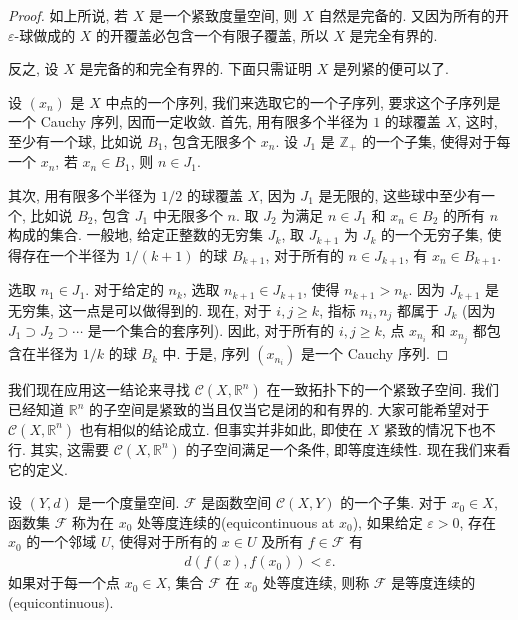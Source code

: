 \documentclass[../../main.tex]{subfiles}
\begin{document}
\begin{proof}
如上所说, 若 $X$ 是一个紧致度量空间, 则 $X$ 自然是完备的. 又因为所有的开 $\varepsilon$-球做成的 $X$ 的开覆盖必包含一个有限子覆盖, 所以 $X$ 是完全有界的.

反之, 设 $X$ 是完备的和完全有界的. 下面只需证明 $X$ 是列紧的便可以了.

设 $(x_n)$ 是 $X$ 中点的一个序列, 我们来选取它的一个子序列, 要求这个子序列是一个 Cauchy 序列, 因而一定收敛. 首先, 用有限多个半径为 $1$ 的球覆盖 $X$, 这时, 至少有一个球, 比如说 $B_1$, 包含无限多个 $x_n$. 设 $J_1$ 是 $\mathbb{Z}_+$ 的一个子集, 使得对于每一个 $x_n$, 若 $x_n\in B_1$, 则 $n\in J_1$.

其次, 用有限多个半径为 $1/2$ 的球覆盖 $X$, 因为 $J_1$ 是无限的, 这些球中至少有一个, 比如说 $B_2$, 包含 $J_1$ 中无限多个 $n$. 取 $J_2$ 为满足 $n\in J_1$ 和 $x_n\in B_2$ 的所有 $n$ 构成的集合. 一般地, 给定正整数的无穷集 $J_k$, 取 $J_{k+1}$ 为 $J_k$ 的一个无穷子集, 使得存在一个半径为 $1/(k+1)$ 的球 $B_{k+1}$, 对于所有的 $n\in J_{k+1}$, 有 $x_n\in B_{k+1}$.

选取 $n_1\in J_1$. 对于给定的 $n_k$, 选取 $n_{k+1}\in J_{k+1}$, 使得 $n_{k+1}>n_k$. 因为 $J_{k+1}$ 是无穷集, 这一点是可以做得到的. 现在, 对于 $i,j\geqslant k$, 指标 $n_i,n_j$ 都属于 $J_k$ (因为 $J_1\supset J_2\supset\cdots$ 是一个集合的套序列). 因此, 对于所有的 $i,j\geqslant k$, 点 $x_{n_i}$ 和 $x_{n_j}$ 都包含在半径为 $1/k$ 的球 $B_k$ 中. 于是, 序列 $(x_{n_i})$ 是一个 Cauchy 序列.
\end{proof}

我们现在应用这一结论来寻找 $\mathcal{C}(X,\mathbb{R}^n)$ 在一致拓扑下的一个紧致子空间. 我们已经知道 $\mathbb{R}^n$ 的子空间是紧致的当且仅当它是闭的和有界的. 大家可能希望对于 $\mathcal{C}(X,\mathbb{R}^n)$ 也有相似的结论成立. 但事实并非如此, 即使在 $X$ 紧致的情况下也不行. 其实, 这需要 $\mathcal{C}(X,\mathbb{R}^n)$ 的子空间满足一个条件, 即等度连续性. 现在我们来看它的定义.

\begin{definition}\label{definition:ch07-equicontinuous}
设 $(Y,d)$ 是一个度量空间. $\mathcal{F}$ 是函数空间 $\mathcal{C}(X,Y)$ 的一个子集. 对于 $x_0\in X$, 函数集 $\mathcal{F}$ 称为在 $x_0$ 处等度连续的(equicontinuous at $x_0$), 如果给定 $\varepsilon>0$, 存在 $x_0$ 的一个邻域 $U$, 使得对于所有的 $x\in U$ 及所有 $f\in\mathcal{F}$ 有
\begin{align*}
d(f(x),f(x_0))<\varepsilon.
\end{align*}
如果对于每一个点 $x_0\in X$, 集合 $\mathcal{F}$ 在 $x_0$ 处等度连续, 则称 $\mathcal{F}$ 是等度连续的(equicontinuous).
\end{definition}
\end{document}

